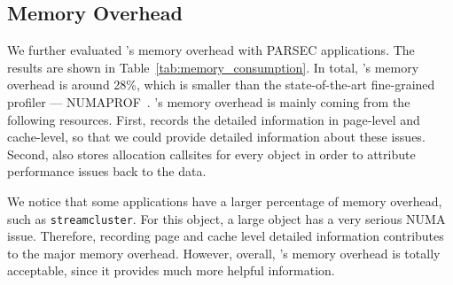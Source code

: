 
\subsection{Memory Overhead}
\label{sec:memory}


We further evaluated \NP{}'s memory overhead with PARSEC applications. The results are shown in Table~\ref{tab:memory_consumption}. In total, \NP{}'s memory overhead is around 28\%, which is  smaller than the state-of-the-art fine-grained profiler --- NUMAPROF~\cite{valat:2018:numaprof}. \NP{}'s memory overhead is mainly coming from the following resources. First, \NP{} records the detailed information in page-level and cache-level, so that we could provide detailed information about these issues. Second, \NP{} also stores allocation callsites for every object in order to attribute performance issues back to the data. 

We notice that some applications have a larger percentage of memory overhead, such as \texttt{streamcluster}. For this object, a large object has a very serious NUMA issue. Therefore, recording page and cache level detailed information contributes to the major memory overhead. However, overall, \NP{}'s memory overhead is totally acceptable, since it provides much more helpful information. 


